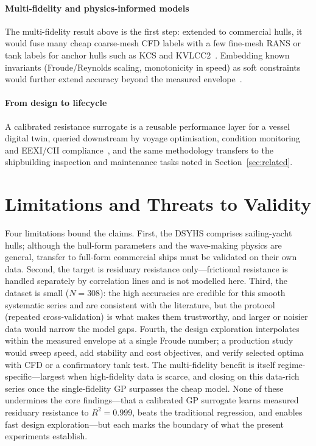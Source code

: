 \documentclass[conference]{IEEEtran}
\begin{document}
\paragraph{Multi-fidelity and physics-informed models}
The multi-fidelity result above is the first step: extended to commercial hulls,
it would fuse many cheap coarse-mesh CFD labels with a few fine-mesh RANS or
tank labels for anchor hulls such as KCS and KVLCC2~\cite{tokyo2015,
legratiet2014}. Embedding known invariants (Froude/Reynolds scaling, monotonicity
in speed) as soft constraints would further extend accuracy beyond the measured
envelope~\cite{raissi2019}.

\paragraph{From design to lifecycle}
A calibrated resistance surrogate is a reusable performance layer for a vessel
digital twin, queried downstream by voyage optimisation, condition monitoring and
EEXI/CII compliance~\cite{major2021}, and the same methodology transfers to the
shipbuilding inspection and maintenance tasks noted in
Section~\ref{sec:related}.

\section{Limitations and Threats to Validity}
\label{sec:limits}

Four limitations bound the claims. First, the DSYHS comprises sailing-yacht
hulls; although the hull-form parameters and the wave-making physics are general,
transfer to full-form commercial ships must be validated on their own data.
Second, the target is residuary resistance only---frictional resistance is
handled separately by correlation lines and is not modelled here. Third, the
dataset is small ($N=\num{308}$): the high accuracies are credible for this
smooth systematic series and are consistent with the literature, but the
protocol (repeated cross-validation) is what makes them trustworthy, and larger
or noisier data would narrow the model gaps. Fourth, the design exploration
interpolates within the measured envelope at a single Froude number; a
production study would sweep speed, add stability and cost objectives, and verify
selected optima with CFD or a confirmatory tank test. The multi-fidelity benefit
is itself regime-specific---largest when high-fidelity data is scarce, and
closing on this data-rich series once the single-fidelity GP surpasses the cheap
model. None of these undermines the core findings---that a calibrated GP surrogate learns measured residuary
resistance to $R^{2}=\num{0.999}$, beats the traditional regression, and enables
fast design exploration---but each marks the boundary of what the present
experiments establish.
\end{document}
